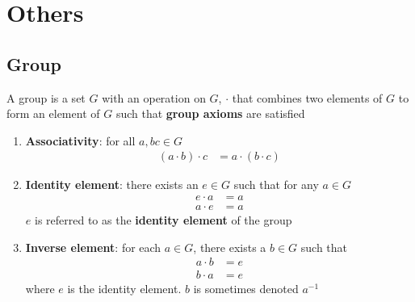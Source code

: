 \chapter{Others}

\section{Group}

  A group is a set $ G $ with an operation on $ G $, $ \cdot $ that combines
  two elements of $ G $ to form an element of $ G $ such that
  \textbf{group axioms} are satisfied

  \begin{enumerate}
    \item \textbf{Associativity}: for all $ a, b c \in G $
    \begin{align}
      \left( a \cdot b \right) \cdot c &= a \cdot \left( b \cdot c \right)
    \end{align}

    \item \textbf{Identity element}: there exists an $ e \in G $ such that for
    any $ a \in G $
    \begin{align}
      e \cdot a &= a \\
      a \cdot e &= a
    \end{align}
    $ e $ is referred to as the \textbf{identity element} of the group

    \item \textbf{Inverse element}: for each $ a \in G $, there exists a
    $ b \in G $ such that
    \begin{align}
      a \cdot b &= e \\
      b \cdot a &= e
    \end{align}
    where $ e $ is the identity element. $ b $ is sometimes denoted $ a^{-1} $
  \end{enumerate}
